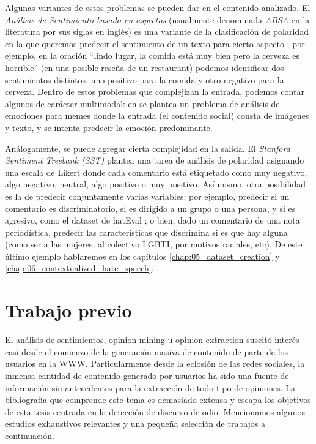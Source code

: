 Algunas variantes de estos problemas se pueden dar en el contenido analizado. El \emph{Análisis de Sentimiento basado en aspectos} (usualmente denominada \emph{ABSA} en la literatura por sus siglas en inglés) es una variante de la clasificación de polaridad en la que queremos predecir el sentimiento de un texto para cierto aspecto \cite{pavlopoulos2014aspect}; por ejemplo, en la oración ``lindo lugar, la comida está muy bien pero la cerveza es horrible'' (en una posible reseña de un restaurant) podemos identificar dos sentimientos distintos: uno positivo para la comida y otro negativo para la cerveza. Dentro de estos problemas que complejizan la entrada, podemos contar algunos de carácter multimodal: en \citet{sharma-etal-2020-semeval} se plantea un problema de análisis de emociones para memes donde la entrada (el contenido social) consta de imágenes y texto, y se intenta predecir la emoción predominante.

Análogamente, se puede agregar cierta complejidad en la salida. El \emph{Stanford Sentiment Treebank (SST)} \cite{socher-etal-2013-recursive} plantea una tarea de análisis de polaridad asignando una escala de Likert \cite{likert1932technique} donde cada comentario está etiquetado como muy negativo, algo negativo, neutral, algo positivo o muy positivo. Así mismo, otra posibilidad es la de predecir conjuntamente varias variables: por ejemplo, predecir si un comentario es discriminatorio, si es dirigido a un grupo o una persona, y si es agresivo, como el dataset de hatEval \cite{hateval2019semeval}; o bien, dado un comentario de una nota periodística, predecir las características que discrimina si es que hay alguna (como ser a las mujeres, al colectivo LGBTI, por motivos raciales, etc). De este último ejemplo hablaremos en los capítulos \ref{chap:05_dataset_creation} y \ref{chap:06_contextualized_hate_speech}.


\section{Trabajo previo}

El análisis de sentimientos, opinion mining u opinion extraction suscitó interés casi desde el comienzo de la generación masiva de contenido de parte de los usuarios en la WWW. Particularmente desde la eclosión de las redes sociales, la inmensa cantidad de contenido generado por usuarios ha sido una fuente de información sin antecedentes para la extracción de todo tipo de opiniones. La bibliografía que comprende este tema es demasiado extensa y escapa los objetivos de esta tesis centrada en la detección de discurso de odio. Mencionamos algunos estudios exhaustivos relevantes y una pequeña selección de trabajos a continuación.

